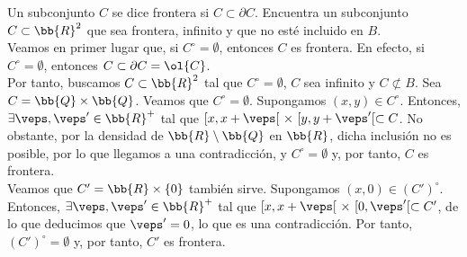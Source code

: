 \documentclass[12pt]{article}
\begin{document}
    \begin{ejercicio}[1.5 puntos]
        Un subconjunto $C$ se dice frontera si $C\subset \partial C$.
        Encuentra un subconjunto $C\subset \bb{R}^2$ que sea frontera, infinito y que no esté incluido en $B$.\\

        Veamos en primer lugar que, si $C^\circ =\emptyset$, entonces $C$ es frontera. En efecto, si $C^\circ =\emptyset$, entonces $C\subset \partial C=\ol{C}$.\\

        Por tanto, buscamos $C\subset \bb{R}^2$ tal que $C^\circ =\emptyset$, $C$ sea infinito y $C\not\subset B$. Sea $C=\bb{Q}\times \bb{Q}$. Veamos que $C^\circ =\emptyset$.
        Supongamos $(x,y)\in C^\circ$. Entonces, $\exists \veps, \veps'\in \bb{R}^+$ tal que $[x,x+\veps[~\times~[y,y+\veps'[ \subset C$.
        No obstante, por la densidad de $\bb{R}\setminus \bb{Q}$ en $\bb{R}$, dicha inclusión no es posible, por lo que llegamos a una contradicción, y $C^\circ =\emptyset$ y,
        por tanto, $C$ es frontera.\\

        Veamos que $C'=\bb{R}\times \{0\}$ también sirve. Supongamos $(x,0)\in (C')^\circ$. Entonces, $\exists \veps, \veps'\in \bb{R}^+$ tal que
        $[x,x+\veps[~\times~[0,\veps'[ \subset C'$, de lo que deducimos que $\veps'=0$, lo que es una contradicción. Por tanto, $(C')^\circ =\emptyset$ y, por tanto,
        $C'$ es frontera.
    \end{ejercicio}
\end{document}

